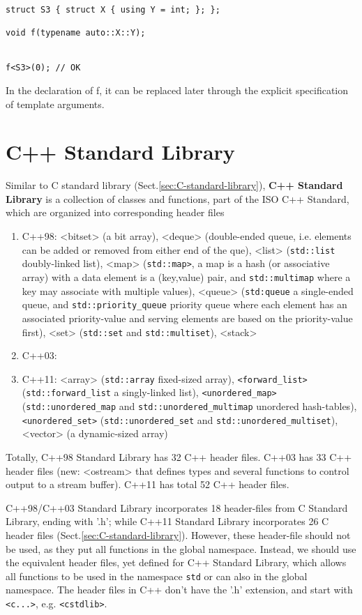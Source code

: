 \begin{verbatim}
struct S3 { struct X { using Y = int; }; };

void f(typename auto::X::Y);


f<S3>(0); // OK
\end{verbatim}
In the declaration of f, it can be replaced later through the explicit specification of template arguments.

\section{C++ Standard Library}
\label{sec:C++_Standard_Library}

Similar to C standard library (Sect.\ref{sec:C-standard-library}), {\bf C++
Standard Library} is a collection of classes and functions, part of the ISO C++
Standard, which are organized into corresponding header files
\begin{enumerate}
  \item C++98: <bitset> (a bit array), <deque> (double-ended queue, i.e.
  elements can be added or removed from either end of the que), <list>
  (\verb!std::list! doubly-linked list), <map> (\verb!std::map>!, a map is a
  hash (or associative array) with a data element is a (key,value) pair, and
  \verb!std::multimap! where a key may associate with multiple values),
  <queue> (\verb!std:queue! a single-ended queue, and \verb!std::priority_queue!
  priority queue where each element has an associated priority-value and  
  serving elements are based on the priority-value first), <set>
  (\verb!std::set! and \verb!std::multiset!), <stack>  
  
  \item C++03:
  
  \item C++11: <array> (\verb!std::array! fixed-sized array),
  \verb!<forward_list>! (\verb!std::forward_list! a singly-linked list),
  \verb!<unordered_map>! (\verb!std::unordered_map! and
  \verb!std::unordered_multimap! unordered hash-tables), \verb!<unordered_set>!
  (\verb!std::unordered_set! and \verb!std::unordered_multiset!), <vector> (a
  dynamic-sized array)
\end{enumerate}

Totally, C++98 Standard Library has 32 C++ header files. C++03 has 33 C++ header
files (new: <ostream> that defines types and several functions to control output
to a stream buffer). C++11 has total 52 C++ header files.

C++98/C++03 Standard Library incorporates 18 header-files from C Standard
Library, ending with '.h'; while C++11 Standard Library incorporates 26 C header
files (Sect.\ref{sec:C-standard-library}). However, these header-file should not
be used, as they put all functions in the global namespace. Instead, we should
use the equivalent header files, yet defined for C++ Standard Library, which
allows all functions to be used in the namespace \verb!std! or can also in the
global namespace. The header files in C++ don't have the '.h' extension, and
start with \verb!<c...>!, e.g.
\verb!<cstdlib>!.

